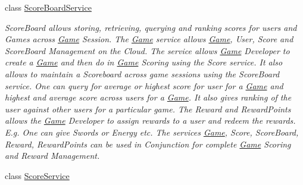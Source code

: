\begin{DoxyCompactItemize}
class \hyperlink{classcom_1_1shephertz_1_1app42_1_1paas_1_1sdk_1_1windows_1_1game_1_1_score_board_service}{Score\+Board\+Service}
\begin{DoxyCompactList}\small\item\em Score\+Board allows storing, retrieving, querying and ranking scores for users and Games across \hyperlink{classcom_1_1shephertz_1_1app42_1_1paas_1_1sdk_1_1windows_1_1game_1_1_game}{Game} Session. The \hyperlink{classcom_1_1shephertz_1_1app42_1_1paas_1_1sdk_1_1windows_1_1game_1_1_game}{Game} service allows \hyperlink{classcom_1_1shephertz_1_1app42_1_1paas_1_1sdk_1_1windows_1_1game_1_1_game}{Game}, User, Score and Score\+Board Management on the Cloud. The service allows \hyperlink{classcom_1_1shephertz_1_1app42_1_1paas_1_1sdk_1_1windows_1_1game_1_1_game}{Game} Developer to create a \hyperlink{classcom_1_1shephertz_1_1app42_1_1paas_1_1sdk_1_1windows_1_1game_1_1_game}{Game} and then do in \hyperlink{classcom_1_1shephertz_1_1app42_1_1paas_1_1sdk_1_1windows_1_1game_1_1_game}{Game} Scoring using the Score service. It also allows to maintain a Scoreboard across game sessions using the Score\+Board service. One can query for average or highest score for user for a \hyperlink{classcom_1_1shephertz_1_1app42_1_1paas_1_1sdk_1_1windows_1_1game_1_1_game}{Game} and highest and average score across users for a \hyperlink{classcom_1_1shephertz_1_1app42_1_1paas_1_1sdk_1_1windows_1_1game_1_1_game}{Game}. It also gives ranking of the user against other users for a particular game. The Reward and Reward\+Points allows the \hyperlink{classcom_1_1shephertz_1_1app42_1_1paas_1_1sdk_1_1windows_1_1game_1_1_game}{Game} Developer to assign rewards to a user and redeem the rewards. E.\+g. One can give Swords or Energy etc. The services \hyperlink{classcom_1_1shephertz_1_1app42_1_1paas_1_1sdk_1_1windows_1_1game_1_1_game}{Game}, Score, Score\+Board, Reward, Reward\+Points can be used in Conjunction for complete \hyperlink{classcom_1_1shephertz_1_1app42_1_1paas_1_1sdk_1_1windows_1_1game_1_1_game}{Game} Scoring and Reward Management. \end{DoxyCompactList}\item 
class \hyperlink{classcom_1_1shephertz_1_1app42_1_1paas_1_1sdk_1_1windows_1_1game_1_1_score_service}{Score\+Service}
\end{DoxyCompactItemize}
